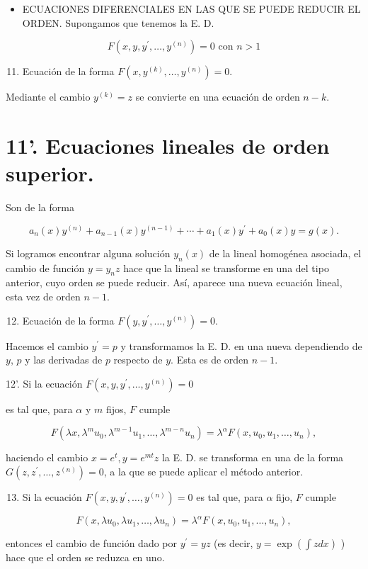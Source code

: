 \documentclass[10pt]{article}
\begin{document}
\begin{itemize}
  \item ECUACIONES DIFERENCIALES EN LAS QUE SE PUEDE REDUCIR EL ORDEN. Supongamos que tenemos la E. D.
\end{itemize}

$$
F\left(x, y, y^{\prime}, \ldots, y^{(n)}\right)=0 \text { con } n>1
$$

\begin{enumerate}
  \setcounter{enumi}{10}
  \item Ecuación de la forma $F\left(x, y^{(k)}, \ldots, y^{(n)}\right)=0$.
\end{enumerate}

Mediante el cambio $y^{(k)}=z$ se convierte en una ecuación de orden $n-k$.

\section*{11'. Ecuaciones lineales de orden superior.}
Son de la forma

$$
a_{n}(x) y^{(n)}+a_{n-1}(x) y^{(n-1)}+\cdots+a_{1}(x) y^{\prime}+a_{0}(x) y=g(x) .
$$

Si logramos encontrar alguna solución $y_{n}(x)$ de la lineal homogénea asociada, el cambio de función $y=y_{n} z$ hace que la lineal se transforme en una del tipo anterior, cuyo orden se puede reducir. Así, aparece una nueva ecuación lineal, esta vez de orden $n-1$.

\begin{enumerate}
  \setcounter{enumi}{11}
  \item Ecuación de la forma $F\left(y, y^{\prime}, \ldots, y^{(n)}\right)=0$.
\end{enumerate}

Hacemos el cambio $y^{\prime}=p$ y transformamos la E. D. en una nueva dependiendo de $y$, $p$ y las derivadas de $p$ respecto de $y$. Esta es de orden $n-1$.

12'. Si la ecuación $F\left(x, y, y^{\prime}, \ldots, y^{(n)}\right)=0$

es tal que, para $\alpha$ y $m$ fijos, $F$ cumple

$$
F\left(\lambda x, \lambda^{m} u_{0}, \lambda^{m-1} u_{1}, \ldots, \lambda^{m-n} u_{n}\right)=\lambda^{\alpha} F\left(x, u_{0}, u_{1}, \ldots, u_{n}\right),
$$

haciendo el cambio $x=e^{t}, y=e^{m t} z$ la E. D. se transforma en una de la forma $G\left(z, z^{\prime}, \ldots, z^{(n)}\right)=0$, a la que se puede aplicar el método anterior.

\begin{enumerate}
  \setcounter{enumi}{12}
  \item Si la ecuación $F\left(x, y, y^{\prime}, \ldots, y^{(n)}\right)=0$ es tal que, para $\alpha$ fijo, $F$ cumple
\end{enumerate}

$$
F\left(x, \lambda u_{0}, \lambda u_{1}, \ldots, \lambda u_{n}\right)=\lambda^{\alpha} F\left(x, u_{0}, u_{1}, \ldots, u_{n}\right),
$$

entonces el cambio de función dado por $y^{\prime}=y z$ (es decir, $y=\exp \left(\int z d x\right)$ ) hace que el orden se reduzca en uno.
\end{document}

